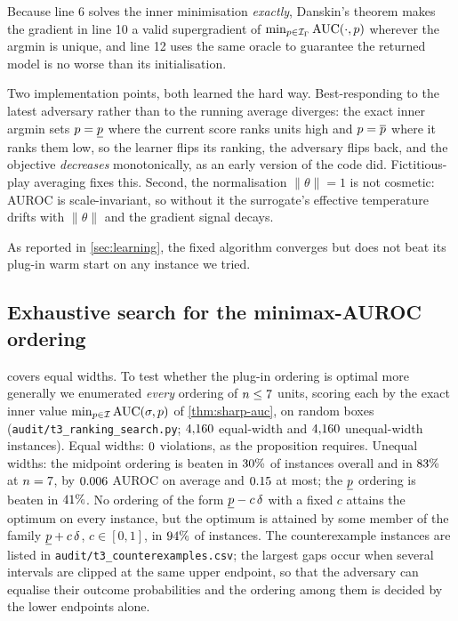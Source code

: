 Because line 6 solves the inner minimisation \emph{exactly}, Danskin's theorem
makes the gradient in line 10 a valid supergradient of
$\min_{p\in\mathcal{I}_\Gamma}\operatorname{AUC}(\cdot,p)$ wherever the argmin is unique, and line 12
uses the same oracle to guarantee the returned model is no worse than its
initialisation.

Two implementation points, both learned the hard way. Best-responding to the
latest adversary rather than to the running average diverges: the exact inner
argmin sets $p=\underline{p}$ where the current score ranks units high and $p=\overline{p}$ where
it ranks them low, so the learner flips its ranking, the adversary flips back,
and the objective \emph{decreases} monotonically, as an early version of the
code did. Fictitious-play averaging fixes this. Second, the
normalisation $\|\theta\|=1$ is not cosmetic: AUROC is scale-invariant, so
without it the surrogate's effective temperature drifts with $\|\theta\|$ and the
gradient signal decays.

As reported in \cref{sec:learning}, the fixed algorithm converges but does not
beat its plug-in warm start on any instance we tried.

\subsection{Exhaustive search for the minimax-AUROC ordering}
\label{app:audit-ranking}

 covers equal widths. To test whether the plug-in ordering
is optimal more generally we enumerated \emph{every} ordering of $n\le7$
units, scoring each by the exact inner value $\min_{p\in\mathcal{I}}\operatorname{AUC}(\sigma,p)$ of
\cref{thm:sharp-auc}, on random boxes (\texttt{audit/t3\_ranking\_search.py};
$4{,}160$ equal-width and $4{,}160$
unequal-width instances). Equal widths: $0$ violations,
as the proposition requires. Unequal widths: the midpoint ordering is beaten
in $30\%$ of instances overall and in
$83\%$ at $n=7$, by $0.006$
AUROC on average and $0.15$ at most; the $\underline{p}$ ordering is
beaten in $41\%$. No ordering of the form
$\underline{p}-c\,\delta$ with a fixed $c$ attains the optimum on every instance, but
the optimum is attained by some member of the family $\underline{p}+c\,\delta$,
$c\in[0,1]$, in $94\%$ of instances. The counterexample instances
are listed in \texttt{audit/t3\_counterexamples.csv}; the largest gaps occur
when several intervals are clipped at the same upper endpoint, so that the
adversary can equalise their outcome probabilities and the ordering among them
is decided by the lower endpoints alone.

